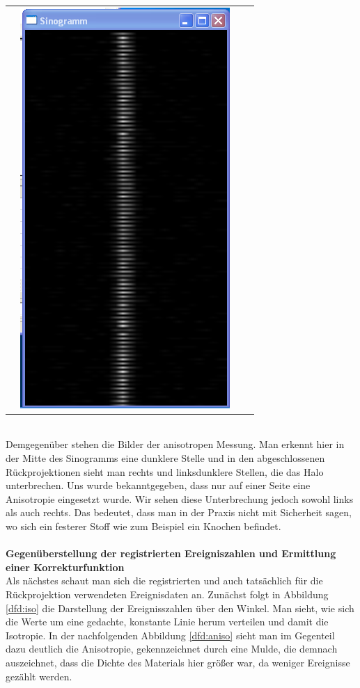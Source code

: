 \begin{longtable}{p{3cm}p{3cm}p{3cm}p{3cm}c}
                  &
                  \multicolumn{2}{c}{\includegraphics[width=.2\textwidth, height=0.25\textheight]{pic/Einzelfenster_Bilder/isotrope_Messung/iso6sino.png}}
           \end{longtable}
           \ \\
           Demgegenüber stehen die Bilder der anisotropen Messung. Man erkennt hier in der Mitte des Sinogramms eine dunklere Stelle und in den abgeschlossenen Rückprojektionen sieht man rechts und
           linksdunklere Stellen, die das Halo unterbrechen. Uns wurde bekanntgegeben, dass nur auf einer Seite eine Anisotropie eingesetzt wurde. Wir sehen diese Unterbrechung jedoch sowohl links als 
           auch rechts. Das bedeutet, dass man in der Praxis nicht mit Sicherheit sagen, wo sich ein festerer Stoff wie zum Beispiel ein Knochen befindet.\\ \ \\
        
        \textbf{Gegenüberstellung der registrierten Ereigniszahlen und Ermittlung einer Korrekturfunktion}\\
        Als nächstes schaut man sich die registrierten und auch tatsächlich für die Rückprojektion verwendeten Ereignisdaten an. Zunächst folgt in Abbildung \ref{dfd:iso} die Darstellung der Ereignisszahlen
        über den Winkel. Man sieht, wie sich die Werte um eine gedachte, konstante Linie herum verteilen und damit die Isotropie. In der nachfolgenden Abbildung \ref{dfd:aniso} sieht man im Gegenteil dazu 
        deutlich die Anisotropie, gekennzeichnet durch eine Mulde, die demnach auszeichnet, dass die Dichte des Materials hier größer war, da weniger Ereignisse gezählt werden. 
        
